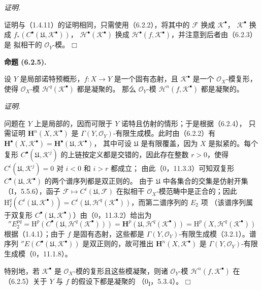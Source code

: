 \documentclass[UTF8,fontset=none,11pt,oneside,openany]{ctexbook}
\providecommand{\square}{\mdlgwhtsquare}
\newenvironment{proposition}[1][]{%
  \par\medskip\noindent\textbf{命题 (#1).}\ %
}{\par}
\newenvironment{proof}{%
  \par\smallskip\noindent\textit{证明.}\ %
}{\hfill$\square$\par}
\begin{document}
\begin{proof}
证明与（1.4.11）的证明相同，只需使用（6.2.2），将其中的
$\mathscr F$ 换成 $\mathscr K^\bullet$，
$\mathscr K^\bullet$ 换成
$f_*(C^\bullet(\mathfrak U,\mathscr K^\bullet))$，
$\mathscr H^\bullet(\mathscr K^\bullet)$ 换成
$\mathscr H^\bullet(f,\mathscr K^\bullet)$，并注意到后者由（6.2.3）是
拟相干的 $\mathscr O_Y$-模。
\end{proof}

\begin{proposition}[6.2.5]
设 $Y$ 是局部诺特预概形，$f:X\to Y$ 是一个固有态射，且
$\mathscr K^\bullet$ 是一个 $\mathscr O_X$-模复形，使得
$\mathscr O_X$-模 $\mathscr H^q(\mathscr K^\bullet)$ 都是凝聚的。
那么 $\mathscr O_Y$-模 $\mathscr H^n(f,\mathscr K^\bullet)$ 都是凝聚的。
\end{proposition}

\begin{proof}
问题在 $Y$ 上是局部的，因而可限于 $Y$ 诺特且仿射的情形；于是根据（6.2.4），
只需证明 $\mathbf H^n(X,\mathscr K^\bullet)$ 是
$\Gamma(Y,\mathscr O_Y)$-有限生成模。此时由（6.2.2）有
$\mathbf H^\bullet(X,\mathscr K^\bullet)= \mathbf H^\bullet(\mathfrak U,\mathscr K^\bullet)$，
其中可设 $\mathfrak U$ 是有限覆盖，因为 $X$ 是拟紧的。每个复形
$C^\bullet(\mathfrak U,\mathscr K^j)$ 的上链按定义都是交错的，因此存在整数
$r>0$，使得 $C^i(\mathfrak U,\mathscr K^j)=0$ 对 $i<0$ 和 $i>r$ 都成立；
由此（0，11.3.3）可知双复形
$C^\bullet(\mathfrak U,\mathscr K^\bullet)$ 的两个谱序列都是双正则的。
由于 $\mathfrak U$ 中各集合的交集是仿射开集（I，5.5.6），函子
$\mathscr F\mapsto C^i(\mathfrak U,\mathscr F)$ 在拟相干
$\mathscr O_X$-模范畴中是正合的；因此
$\mathrm H_I^q(C^i(\mathfrak U,\mathscr K^\bullet))
=C^i(\mathfrak U,\mathscr H^q(\mathscr K^\bullet))$，而第二谱序列的 $E_2$ 项
（该谱序列属于双复形 $C^\bullet(\mathfrak U,\mathscr K^\bullet)$）由（0，11.3.2）给出为
\[
  ''E_2^{pq}
  =\mathrm H^p(C^\bullet(\mathfrak U,\mathscr H^q(\mathscr K^\bullet)))
  =\mathbf H^p(\mathfrak U,\mathscr H^q(\mathscr K^\bullet))
  =\mathrm H^p(X,\mathscr H^q(\mathscr K^\bullet))
\]
根据（1.4.1）；由于 $f$ 是固有态射，这些都是
$\Gamma(Y,\mathscr O_Y)$-有限生成模（3.2.1）。谱序列
$''E(C^\bullet(\mathfrak U,\mathscr K^\bullet))$ 是双正则的，故可推出
$\mathbf H^n(X,\mathscr K^\bullet)$ 是
$\Gamma(Y,\mathscr O_Y)$-有限生成模（0，11.1.8）。

特别地，若 $\mathscr K^\bullet$ 是 $\mathscr O_X$-模的复形且这些模凝聚，则诸
$\mathscr O_Y$-模 $\mathscr H^n(f,\mathscr K^\bullet)$ 在（6.2.5）关于
$Y$ 与 $f$ 的假设下都是凝聚的
（0\textsubscript{I}，5.3.4）。
\end{proof}
\end{document}
